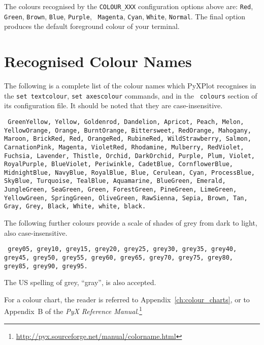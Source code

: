 The colours recognised by the {\tt COLOUR\_XXX} configuration options above
are: {\tt Red}, {\tt Green}, {\tt Brown}, {\tt Blue}, {\tt Purple}, {\tt
Magenta}, {\tt Cyan}, {\tt White}, {\tt Normal}. The final option produces the
default foreground colour of your terminal.

\section{Recognised Colour Names}
\label{sec:colour_names}

The following is a complete list of the colour names which PyXPlot recognises
in the {\tt set textcolour}, {\tt set axescolour} commands, and in the {\tt
colours} section of its configuration file. It should be noted that they are
case-insensitive.

\vspace{5mm}\noindent
{}
{\tt
GreenYellow, Yellow, Goldenrod, Dandelion, Apricot, Peach, Melon, YellowOrange, Orange, BurntOrange, Bittersweet, RedOrange, Mahogany, Maroon, BrickRed, Red, OrangeRed, RubineRed, WildStrawberry, Salmon, CarnationPink, Magenta, VioletRed, Rhodamine, Mulberry, RedViolet, Fuchsia, Lavender, Thistle, Orchid, DarkOrchid, Purple, Plum, Violet, RoyalPurple, BlueViolet, Periwinkle, CadetBlue, CornflowerBlue, MidnightBlue, NavyBlue, RoyalBlue, Blue, Cerulean, Cyan, ProcessBlue, SkyBlue, Turquoise, TealBlue, Aquamarine, BlueGreen, Emerald, JungleGreen, SeaGreen, Green, ForestGreen, PineGreen, LimeGreen, YellowGreen, SpringGreen, OliveGreen, RawSienna, Sepia, Brown, Tan, Gray, Grey, Black, White, white, black.
}

\vspace{5mm}
The following further colours provide a scale of shades of grey from dark to light, also case-insensitive.

\vspace{5mm}\noindent
{}
{\tt
grey05, grey10, grey15, grey20, grey25, grey30, grey35, grey40, grey45, grey50, grey55, grey60, grey65, grey70, grey75, grey80, grey85, grey90, grey95.
}

\vspace{5mm}\noindent
The US spelling of grey, ``gray'', is also accepted.

For a colour chart, the reader is referred to Appendix~\ref{ch:colour_charts},
or to Appendix~B of the {\it PyX Reference
Manual}.\footnote{\url{http://pyx.sourceforge.net/manual/colorname.html}}

